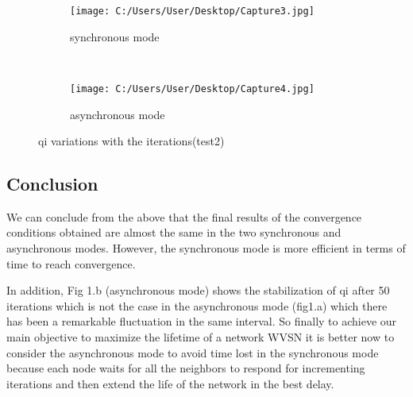 \documentclass[12pt,a4]{article}
\begin{document}
\vspace{0.8cm}

\begin{figure}[ht]
\centering
	\begin{center}
	     \begin{subfigure}[normla]{0.4\textwidth}
		\texttt{[image: C:/Users/User/Desktop/Capture3.jpg]}
		\caption{synchronous mode}
	    \end{subfigure}
\hspace{0.8cm}
	~
	    \begin{subfigure}[normla]{0.4\textwidth}
		\texttt{[image: C:/Users/User/Desktop/Capture4.jpg]}
		\caption{asynchronous mode}
	    \end{subfigure}
	\end{center}
\caption{qi variations with the iterations(test2) }
\end{figure}

\subsection{Conclusion}

\hspace{0.6cm}We can conclude from the above that the final results of the convergence conditions obtained are almost the same in the two synchronous and asynchronous modes. However, the synchronous mode is more efficient in terms of time to reach convergence.

In addition, Fig 1.b (asynchronous mode) shows the stabilization of qi after 50 iterations which is not the case in the asynchronous mode (fig1.a) which there has been a remarkable fluctuation in the same interval. 
So finally to achieve our main objective to maximize the lifetime of a network WVSN it is better now to consider the asynchronous mode to avoid time lost in the synchronous mode because each node waits for all the neighbors to respond for incrementing iterations and then extend the life of the network in the best delay.
\end{document}
